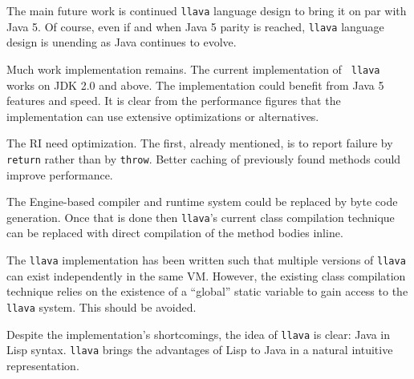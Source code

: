 \documentclass{acm-final/sig-alternate-modified}
\begin{document}
The main future work is continued {\tt llava} language design to bring
it on par with Java 5.  Of course, even if and when Java 5 parity is
reached, {\tt llava} language design is unending as Java continues to
evolve.

Much work implementation remains.  The current implementation of {\tt
llava} works on JDK 2.0 and above.  The implementation could benefit
from Java 5 features and speed.  It is clear from the performance
figures that the implementation can use extensive optimizations or
alternatives.

The RI need optimization.  The first, already mentioned, is to report
failure by {\tt return} rather than by {\tt throw}.  Better caching of
previously found methods could improve performance.

The Engine-based compiler and runtime system could be replaced by byte
code generation.  Once that is done then {\tt llava}'s current class
compilation technique can be replaced with direct compilation of the
method bodies inline.  

The {\tt llava} implementation has been written such
that multiple versions of {\tt llava} can exist independently in the
same VM.  However, the existing class compilation technique relies on the
existence of a ``global'' static variable to gain access to the {\tt
llava} system.  This should be avoided.

Despite the implementation's shortcomings, the idea of {\tt llava} is
clear: Java in Lisp syntax.  {\tt llava} brings the advantages of Lisp
to Java in a natural intuitive representation.
\end{document}
